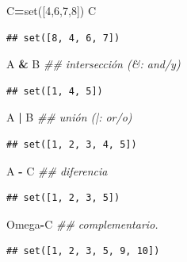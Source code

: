 \documentclass[]{book}
\newenvironment{Shaded}{\begin{snugshade}}{\end{snugshade}}
\newcommand{\BuiltInTok}[1]{#1}
\newcommand{\CommentTok}[1]{\textcolor[rgb]{0.56,0.35,0.01}{\textit{#1}}}
\newcommand{\DecValTok}[1]{\textcolor[rgb]{0.00,0.00,0.81}{#1}}
\newcommand{\NormalTok}[1]{#1}
\newcommand{\OperatorTok}[1]{\textcolor[rgb]{0.81,0.36,0.00}{\textbf{#1}}}
\begin{document}
\begin{Shaded}
\begin{Highlighting}[]
\NormalTok{C}\OperatorTok{=}\BuiltInTok{set}\NormalTok{([}\DecValTok{4}\NormalTok{,}\DecValTok{6}\NormalTok{,}\DecValTok{7}\NormalTok{,}\DecValTok{8}\NormalTok{])}
\NormalTok{C}
\end{Highlighting}
\end{Shaded}

\begin{verbatim}
## set([8, 4, 6, 7])
\end{verbatim}

\begin{Shaded}
\begin{Highlighting}[]
\NormalTok{A }\OperatorTok{&}\NormalTok{ B   }\CommentTok{## intersección (&: and/y)}
\end{Highlighting}
\end{Shaded}

\begin{verbatim}
## set([1, 4, 5])
\end{verbatim}

\begin{Shaded}
\begin{Highlighting}[]
\NormalTok{A }\OperatorTok{|}\NormalTok{ B   }\CommentTok{## unión (|: or/o)}
\end{Highlighting}
\end{Shaded}

\begin{verbatim}
## set([1, 2, 3, 4, 5])
\end{verbatim}

\begin{Shaded}
\begin{Highlighting}[]
\NormalTok{A }\OperatorTok{-}\NormalTok{ C   }\CommentTok{## diferencia }
\end{Highlighting}
\end{Shaded}

\begin{verbatim}
## set([1, 2, 3, 5])
\end{verbatim}

\begin{Shaded}
\begin{Highlighting}[]
\NormalTok{Omega}\OperatorTok{-}\NormalTok{C }\CommentTok{## complementario.}
\end{Highlighting}
\end{Shaded}

\begin{verbatim}
## set([1, 2, 3, 5, 9, 10])
\end{verbatim}
\end{document}
